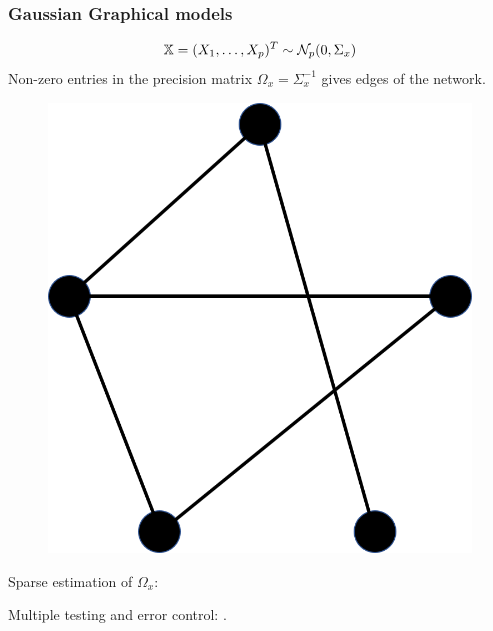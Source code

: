 \documentclass[10pt]{beamer}
\theoremstyle{definition}
\begin{document}
\begin{frame}
\frametitle{Gaussian Graphical models}

$$
{\mathbb{X}} = (X_1, \ldots, X_p)^T \sim {\cal{N}}_p (0, \Sigma_x)
$$
%
Non-zero entries in the {\colb precision matrix} $\Omega_x = \Sigma_x^{-1}$ gives edges of the network.

\begin{figure}
\centering
\includegraphics[width=.4\textwidth]{formulation_2}
\end{figure}

Sparse estimation of $\Omega_x$: {\colr \cite{MeisenBuhlmann06}}

Multiple testing and error control: {\colr \cite{DrtonPerlman07}}.

\end{frame}
\end{document}
